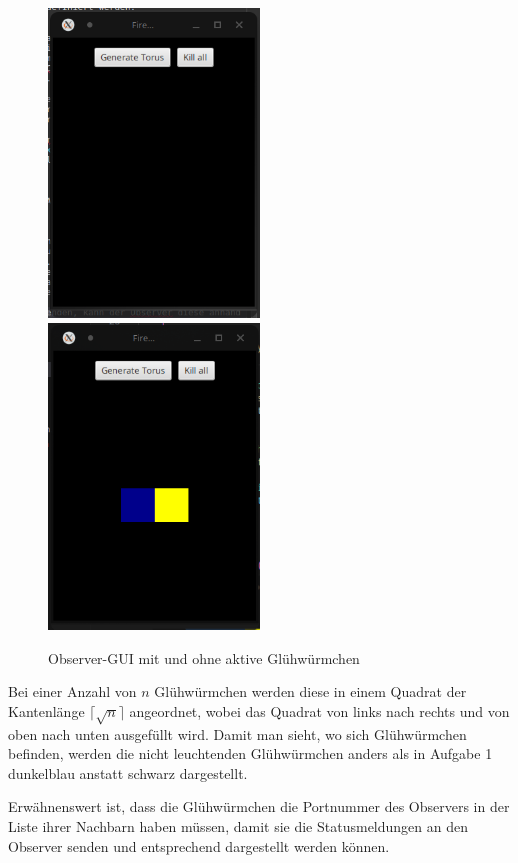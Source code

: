 \documentclass[12pt]{article}
\begin{document}
\begin{figure}[H]
	\includegraphics[width=0.5\textwidth]{./img/screenshot_observer_idle}
	\includegraphics[width=0.5\textwidth]{./img/screenshot_observer_two_fireflies}
	\caption{Observer-GUI mit und ohne aktive Glühwürmchen}
\end{figure}

Bei einer Anzahl von $n$ Glühwürmchen werden diese in einem Quadrat der Kantenlänge $\lceil \sqrt{n} \rceil$ angeordnet, wobei das Quadrat von links nach rechts und von oben nach unten ausgefüllt wird. Damit man sieht, wo sich Glühwürmchen befinden, werden die nicht leuchtenden Glühwürmchen anders als in Aufgabe 1 dunkelblau anstatt schwarz dargestellt.

Erwähnenswert ist, dass die Glühwürmchen die Portnummer des Observers in der Liste ihrer Nachbarn haben müssen, damit sie die Statusmeldungen an den Observer senden und entsprechend dargestellt werden können.
\end{document}
